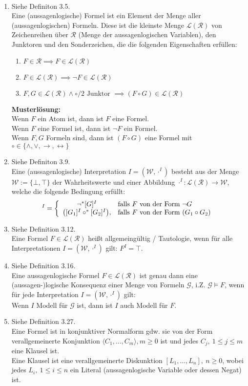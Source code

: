 \documentclass[12pt,a4paper]{article}
\renewcommand{\L}{\mathcal{L}} %
\newcommand{\RR}{\mathcal{R}} %
\newcommand{\G}{\mathcal{G}}
\newcommand{\W}{\mathcal{W}}
\begin{document}
\begin{lösung}\
\begin{enumerate}
\item Siehe Definiton 3.5.\\
Eine (aussagenlogische) Formel ist ein Element der Menge aller (aussagenlogischen) Formeln. Diese ist die kleinste Menge $\L(\RR)$ von Zeichenreihen über $\RR$ (Menge der aussagenlogischen Variablen), den Junktoren und den Sonderzeichen, die die folgenden Eigenschaften erfüllen:
\begin{enumerate}
\item $F\in\RR\implies F\in\L(\RR)$
\item $F\in\L(\RR)\implies\neg F\in\L(\RR)$
\item $F,G\in\L(\RR)\wedge\circ/2\text{ Junktor }\implies(F\circ G)\in\L(\RR)$
\end{enumerate}
\textbf{Musterlösung:}\\
Wenn $F$ ein Atom ist, dann ist $F$ eine Formel.\\
Wenn $F$ eine Formel ist, dann ist $\neg F$ ein Formel.\\
Wenn $F,G$ Formeln sind, dann ist $(F\circ G)$ eine Formel mit $\circ\in\lbrace\wedge, \vee,\to,\longleftrightarrow\rbrace$
\item Siehe Definiton 3.9.\\
Eine (aussagenlogische) Interpretation $I=(\W,\cdot^I)$ besteht aus der Menge $\W:=\lbrace\bot,\top\rbrace$ der Wahrheitswerte und einer Abbildung $\cdot^I:\L(\RR)\to\W$, welche die folgende Bedingung erfüllt:
\begin{align*}
[F]^I=\left\lbrace\begin{array}{cl}
\neg^\ast[G]^I & \falls F \text{ von der Form }\neg G\\
\big([G_1]^I\circ^\ast[G_2]^I\big), &\falls F\text{ von der Form }(G_1\circ G_2)
\end{array}\right.
\end{align*}
\item Siehe Definition 3.12.\\
Eine Formel $F\in\L(\RR)$ heißt allgemeingültig / Tautologie, wenn für alle Interpretationen $I=(\W,\cdot^I)$ gilt: $F^I=\top$.
\item Siehe Definition 3.16.\\
Eine aussagenlogische Formel $F\in\L(\RR)$ ist genau dann eine (aussagen-)logische Konsequenz einer Menge von Formeln $\G$, i.Z. $\G\models F$, wenn für jede Interpretation $I=(\W,\cdot^I)$ gilt:\\
Wenn $I$ Modell für $\G$ ist, dann ist $I$ auch Modell für $F$.
\item Siehe Definition 3.27.\\
Eine Formel ist in konjunktiver Normalform gdw. sie von der Form verallgemeinerte Konjunktion $\langle C_1,\ldots,C_m\rangle,m\geq0$ ist und jedes $C_j,~1\leq j\leq m$ eine Klausel ist.\\
Eine Klausel ist eine verallgemeinerte Diskunktion  $[L_1,\ldots,L_n],~n\geq0$, wobei jedes $L_i,~1\leq i\leq n$ ein Literal (aussagenlogische Variable oder dessen Negat) ist.
\end{enumerate}
\end{lösung}
\end{document}
